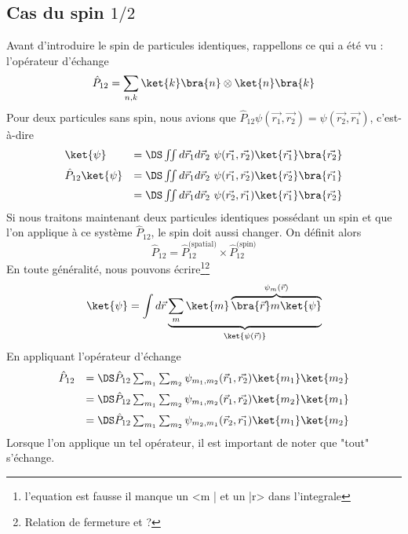 \subsection{Cas du spin $1/2$}
Avant d'introduire le spin de particules identiques, rappellons ce qui a été vu : l'opérateur d'échange
\begin{equation}
\hat{P}_{12} = \sum_{n,k} \ket{k}\bra{n}\otimes\ket{n}\bra{k}
\end{equation}
Pour deux particules sans spin, nous avions que $\hat{P}_{12}\psi(\vec{r_1},\vec{r_2})=\psi(\vec{r_2},\vec{r_1})$, 
c'est-à-dire
\begin{equation}
\begin{array}{ll}
\ket{\psi} &=\DS \iint d\vec{r}_1d\vec{r}_2\ \psi(\vec{r_1},\vec{r_2})\ket{\vec{r_1}}\bra{\vec{r_2}}\vspace{2mm}\\
\hat{P}_{12}\ket{\psi}&=\DS \iint d\vec{r}_1d\vec{r}_2\ \psi(\vec{r_1},\vec{r_2})\ket{\vec{r_2}}\bra{\vec{r_1}}\vspace{2mm}\\
&=\DS \iint d\vec{r}_1d\vec{r}_2\ \psi(\vec{r_2},\vec{r_1})\ket{\vec{r_1}}\bra{\vec{r_2}}
\end{array}
\end{equation}
Si nous traitons maintenant deux particules identiques possédant un spin et que l'on applique à ce système $\hat{P}_{12}$, 
le spin doit aussi changer. On définit alors 
\begin{equation}
\hat{P}_{12} = \hat{P}_{12}^{\text{(spatial)}}\times\hat{P}_{12}^{\text{(spin)}}
\end{equation}
En toute généralité, nous pouvons écrire\footnote{l'equation est fausse il manque un <m | et un |r> dans l'integrale }\footnote{Relation de fermeture et ? }
\begin{equation}
\ket{\psi} = \int d\vec{r}\underbrace{\sum_m\ket{m}\overbrace{\bra{\vec{r}}m\ket{\psi}}^{\psi_m(\vec{r})}}_{\ket{\psi(\vec{r})}}
\end{equation}
En appliquant l'opérateur d'échange
\begin{equation}
\begin{array}{ll}
\hat{P}_{12} &=\DS \hat{P}_{12} \sum_{m_1}\sum_{m_2} \psi_{m_1,m_2}(\vec{r}_1,\vec{r_2})\ket{m_1}\ket{m_2}\vspace{2mm}\\
&=\DS \hat{P}_{12} \sum_{m_1}\sum_{m_2} \psi_{m_1,m_2}(\vec{r}_1,\vec{r_2})\ket{m_2}\ket{m_1}\vspace{2mm}\\
&=\DS \hat{P}_{12} \sum_{m_1}\sum_{m_2} \psi_{m_2,m_1}(\vec{r}_2,\vec{r_1})\ket{m_1}\ket{m_2}
\end{array}
\end{equation}
Lorsque l'on applique un tel opérateur, il est important de noter que "tout" s'échange.

